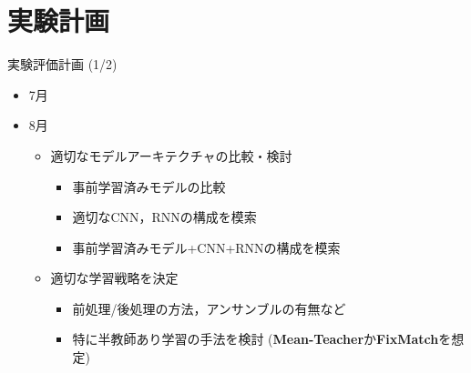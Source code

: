 \documentclass[unicode,12pt,aspectratio=169,dvipdfmx]{beamer}
\begin{document}
\section{実験計画}
\begin{frame}{実験評価計画 (1/2)}
    \begin{itemize}
        \item 7月
        \item 8月
        \begin{itemize}
            \item 適切なモデルアーキテクチャの比較・検討
            \begin{itemize}
                \item 事前学習済みモデルの比較
                \item 適切なCNN，RNNの構成を模索
                \item 事前学習済みモデル+CNN+RNNの構成を模索
            \end{itemize}
            \item 適切な学習戦略を決定
            \begin{itemize}
                \item 前処理/後処理の方法，アンサンブルの有無など
                \item 特に半教師あり学習の手法を検討 (\textbf{Mean-Teacher}か\textbf{FixMatch}を想定)
            \end{itemize}
        \end{itemize}
    \end{itemize}
\end{frame}
\end{document}
